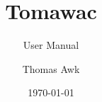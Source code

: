 \documentclass[Tomawac]{../../data/TelemacDoc} %
\begin{document}
\let\cleardoublepage\clearpage

\title{Tomawac}
\subtitle{User Manual}
\author{Thomas Awk}
\date{\today}
\maketitle
\clearpage



\newpage

\thispagestyle{empty}

\TelemacCopyright{}




\pagestyle{empty} %

\tableofcontents%


\pagestyle{fancy} %













\end{document}
